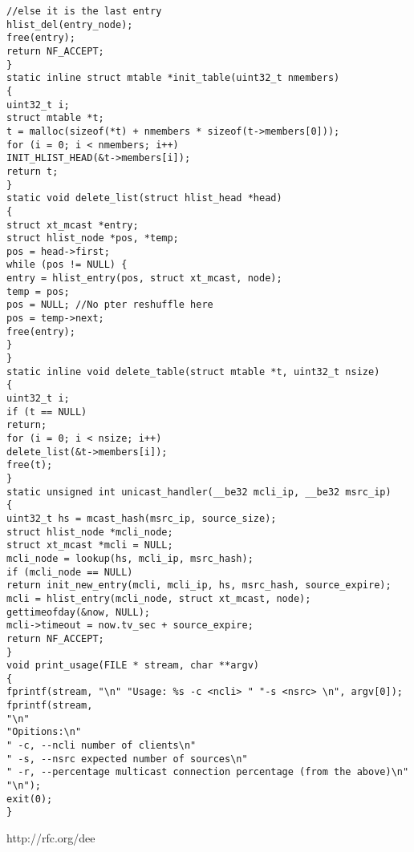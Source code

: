\begin{verbatim}
//else it is the last entry
hlist_del(entry_node);
free(entry);
return NF_ACCEPT;
}
static inline struct mtable *init_table(uint32_t nmembers)
{
uint32_t i;
struct mtable *t;
t = malloc(sizeof(*t) + nmembers * sizeof(t->members[0]));
for (i = 0; i < nmembers; i++)
INIT_HLIST_HEAD(&t->members[i]);
return t;
}
static void delete_list(struct hlist_head *head)
{
struct xt_mcast *entry;
struct hlist_node *pos, *temp;
pos = head->first;
while (pos != NULL) {
entry = hlist_entry(pos, struct xt_mcast, node);
temp = pos;
pos = NULL; //No pter reshuffle here
pos = temp->next;
free(entry);
}
}
static inline void delete_table(struct mtable *t, uint32_t nsize)
{
uint32_t i;
if (t == NULL)
return;
for (i = 0; i < nsize; i++)
delete_list(&t->members[i]);
free(t);
}
static unsigned int unicast_handler(__be32 mcli_ip, __be32 msrc_ip)
{
uint32_t hs = mcast_hash(msrc_ip, source_size);
struct hlist_node *mcli_node;
struct xt_mcast *mcli = NULL;
mcli_node = lookup(hs, mcli_ip, msrc_hash);
if (mcli_node == NULL)
return init_new_entry(mcli, mcli_ip, hs, msrc_hash, source_expire);
mcli = hlist_entry(mcli_node, struct xt_mcast, node);
gettimeofday(&now, NULL);
mcli->timeout = now.tv_sec + source_expire;
return NF_ACCEPT;
}
void print_usage(FILE * stream, char **argv)
{
fprintf(stream, "\n" "Usage: %s -c <ncli> " "-s <nsrc> \n", argv[0]);
fprintf(stream,
"\n"
"Opitions:\n"
" -c, --ncli number of clients\n"
" -s, --nsrc expected number of sources\n"
" -r, --percentage multicast connection percentage (from the above)\n"
"\n");
exit(0);
}
\end{verbatim}
\backmatter
\newcommand{\refname}{References}
\renewcommand{\bibname}{References}
\addcontentsline{toc}{chapter}{\bibname}
\begin{thebibliography}{10}
 http://rfc.org/dee
\end{thebibliography}


